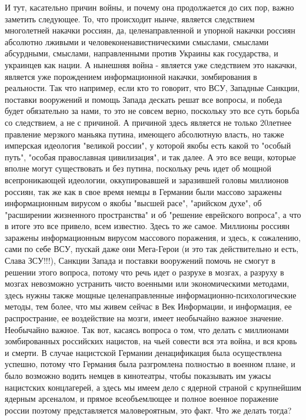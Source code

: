 И тут, касательно причин войны, и почему она продолжается до сих пор, важно
заметить следующее. То, что происходит нынче, является следствием многолетней
накачки россиян, да, целенаправленной и упорной накачки россиян абсолютно
лживыми и человеконенавистническими смыслами, смыслами абсурдными, смыслами,
направленными против Украины как государства, и украинцев как нации. А нынешняя
война - является уже следствием это накачки, является уже порождением
информационной накачки, зомбирования в реальности. Так что например, если кто
то говорит, что ВСУ, Западные Санкции, поставки вооружений и помощь Запада
дескать решат все вопросы, и победа будет обязательно за нами, то это не совсем
верно, поскольку это все суть борьба со следствием, а не с причиной.  А
причиной здесь является не только 20летнее правление мерзкого маньяка путина,
имеющего абсолютную власть, но также имперская идеология "великой россии", у
которой якобы есть какой то "особый путь", "особая православная цивилизация",
и так далее. А это все вещи, которые вполне могут существовать и без путина,
поскольку речь идет об мощной всепроникающей идеологии, оккупировавшей и
заразившей головы миллионов россиян, так же как в свое время немцы в Германии
были массово заражены информационным вирусом о якобы "высшей расе", "арийском
духе", об "расширении жизненного пространства" и об "решение еврейского
вопроса", а что в итоге это все привело, всем известно. Здесь то же самое.
Миллионы россиян заражены информационным вирусом массового поражения, и здесь,
к сожалению, сами по себе ВСУ, пускай даже они Мега-Герои (и это так
действительно и есть, Слава ЗСУ!!!), Санкции Запада и поставки вооружений
помочь не смогут в решении этого вопроса, потому что речь идет о разрухе в
мозгах, а разруху в мозгах невозможно устранить чисто военными или
экономическими методами, здесь нужны также мощные целенаправленные
информационно-психологические методы, тем более, что мы живем сейчас в Век
Информации, и информация, ее распространие, ее воздействие на мозги, имеет
необычайно важное значение. Необычайно важное.  Так вот, касаясь вопроса о том,
что делать с миллионами зомбированных российских нацистов, на чьей совести вся
эта война, и вся кровь и смерти. В случае нацистской Германии денацификация
была осуществлена успешно, потому что Германия была разгромлена полностью в
военном плане, и было возможно водить немцев в кинотеатры, чтобы показывать им
ужасы нацистских концлагерей, а здесь мы имеем дело с ядерной страной с
крупнейшим ядерным арсеналом, и прямое всеобъемлющее и полное военное поражение
россии поэтому представляется маловероятным, это факт.  Что же делать тогда?

